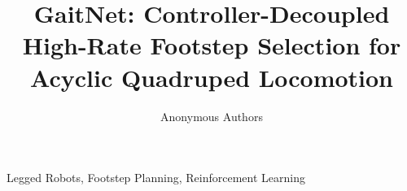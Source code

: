 \documentclass[conference]{IEEEtran}
\begin{document}
\title{GaitNet: Controller-Decoupled High-Rate Footstep Selection for
  Acyclic Quadruped Locomotion}

\author{Anonymous Authors}

\maketitle



\begin{IEEEkeywords}
  Legged Robots, Footstep Planning, Reinforcement Learning
\end{IEEEkeywords}








\end{document}
